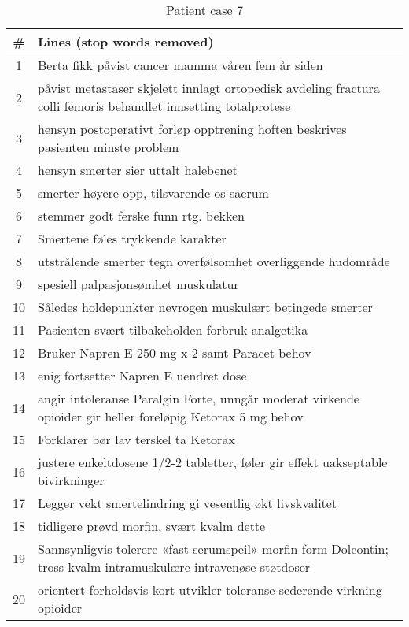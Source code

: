 \begin{table}[htbp] \footnotesize \center
\caption{Patient case 7\label{tab:pcase7}}
\begin{tabularx}{\textwidth}{c X}
    \toprule
    \# & Lines (stop words removed) \\
    \midrule
	1 & Berta fikk påvist cancer mamma våren fem år siden \\
	2 & påvist metastaser skjelett innlagt ortopedisk avdeling fractura colli femoris behandlet innsetting totalprotese \\
	3 & hensyn postoperativt forløp opptrening hoften beskrives pasienten minste problem \\
	4 & hensyn smerter sier uttalt halebenet \\
	5 & smerter høyere opp, tilsvarende os sacrum \\
	6 & stemmer godt ferske funn rtg. bekken \\
	7 & Smertene føles trykkende karakter \\
	8 & utstrålende smerter tegn overfølsomhet overliggende hudområde \\
	9 & spesiell palpasjonsømhet muskulatur \\
	10 & Således holdepunkter nevrogen muskulært betingede smerter \\
	11 & Pasienten svært tilbakeholden forbruk analgetika \\
	12 & Bruker Napren E 250 mg x 2 samt Paracet behov \\
	13 & enig fortsetter Napren E uendret dose \\
	14 & angir intoleranse Paralgin Forte, unngår moderat virkende opioider gir heller foreløpig Ketorax 5 mg behov \\
	15 & Forklarer bør lav terskel ta Ketorax \\
	16 & justere enkeltdosene 1/2-2 tabletter, føler gir effekt uakseptable bivirkninger \\
	17 & Legger vekt smertelindring gi vesentlig økt livskvalitet \\
	18 & tidligere prøvd morfin, svært kvalm dette \\
	19 & Sannsynligvis tolerere «fast serumspeil» morfin form Dolcontin; tross kvalm intramuskulære intravenøse støtdoser \\
	20 & orientert forholdsvis kort utvikler toleranse sederende virkning opioider \\
	\bottomrule
\end{tabularx}
\end{table}


